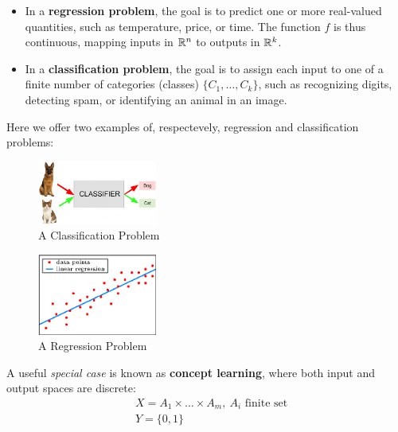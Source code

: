 \documentclass[10pt, letterpaper]{report}
\begin{document}
\begin{itemize}
	\item In a \textbf{regression problem}, the goal is to predict one or more real-valued quantities, such as temperature, price, or time. The function $f$ is thus continuous, mapping inputs in ${\mathbb R}^n$ to outputs in ${\mathbb R}^k$.
	\item In a \textbf{classification problem}, the goal is to assign each input to one of a finite number of categories (classes) $\{C_1, \dots, C_k\}$, such as recognizing digits, detecting spam, or identifying an animal in an image.
\end{itemize}

\newpage
Here we offer two examples of, respectevely, regression and classification problems:

\bigskip
\begin{figure}[h!]
	\centering
	\includegraphics[width=0.35\textwidth]{images/classifier.png}
	\caption{A Classification Problem}
	\label{img:ClassificationProblem}
\end{figure}

\bigskip
\begin{figure}[h!]
	\centering
	\includegraphics[width=0.35\textwidth]{images/regression.eps}
	\caption{A Regression Problem}
	\label{img:RegressionProblem}
\end{figure}

\bigskip
A useful \textit{special case} is known as \textbf{concept learning}, where both input and output spaces are discrete:
\begin{align*}
	 & X = A_1\times \dots \times A_m, \ A_i \text{ finite set} \\
	 & Y = \{0,1\}
\end{align*}
\end{document}
